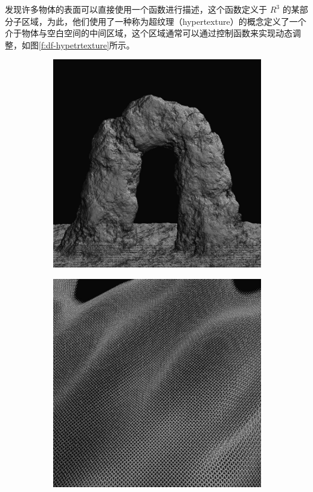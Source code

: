 \cite{a:hypetrtexture}发现许多物体的表面可以直接使用一个函数进行描述，这个函数定义于 $R^{3}$ 的某部分子区域，为此，他们使用了一种称为超纹理（hypertexture）的概念定义了一个介于物体与空白空间的中间区域，这个区域通常可以通过控制函数来实现动态调整，如图\ref{f:df-hypetrtexture}所示。

\begin{figure}
	\begin{subfigure}[b]{0.32\textwidth}
		\includegraphics[width=\textwidth]{figures/df/hypertexture1}
	\end{subfigure}
	\begin{subfigure}[b]{0.32\textwidth}
		\includegraphics[width=\textwidth]{figures/df/hypertexture2}

\end{subfigure}
\end{figure}
